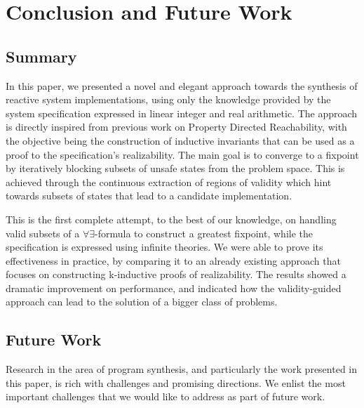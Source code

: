 \section{Conclusion and Future Work}
\label{sec:conclusion}

\subsection{Summary}

In this paper, we presented a novel and elegant approach towards the synthesis
of reactive system implementations, using only the knowledge provided by the
system specification expressed in linear integer and real arithmetic. The approach is
directly inspired from previous work on Property Directed Reachability, with the objective being the construction of inductive
invariants that can be used as a proof to the specification's realizability. The
main goal is to converge to a fixpoint by iteratively blocking subsets of
unsafe states from the problem space. This is achieved through the continuous
extraction of regions of validity which hint towards subsets of states that
lead to a candidate implementation.

This is the first complete attempt, to the best of our knowledge, on handling
valid subsets of a $\forall\exists$-formula to construct a greatest fixpoint,
while the specification is expressed using infinite theories. We were able to
prove its effectiveness in practice, by comparing it to an already existing
approach that focuses on constructing k-inductive proofs of realizability. The
results showed a dramatic improvement on performance, and indicated how the
validity-guided approach can lead to the solution of a bigger class of problems.

\subsection{Future Work}
Research in the area of program synthesis, and particularly the work presented in this paper, is rich with challenges and promising directions. We enlist the most important challenges that we would like to address as part of future work.

